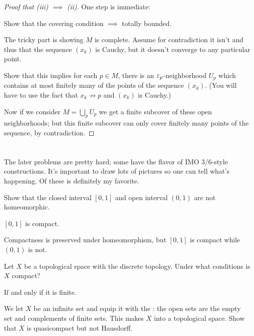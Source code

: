 \begin{proof}
	[Proof that (iii) $\implies$ (ii)]
	One step is immediate:
	\begin{ques}
		Show that the covering condition $\implies$ totally bounded.
	\end{ques}
	The tricky part is showing $M$ is complete.
	Assume for contradiction it isn't and thus that the sequence $(x_k)$ is Cauchy,
	but it doesn't converge to any particular point.
	\begin{ques}
		Show that this implies for each $p \in M$, there is an $\varepsilon_p$-neighborhood $U_p$
		which contains at most finitely many of the points of the sequence $(x_k)$.
		(You will have to use the fact that $x_k \not\to p$ and $(x_k)$ is Cauchy.)
	\end{ques}
	Now if we consider $M = \bigcup_p U_p$ we get a
	finite subcover of these open neighborhoods;
	but this finite subcover can only cover finitely
	many points of the sequence, by contradiction.
\end{proof}


\section{\problemhead}
The later problems are pretty hard;
some have the flavor of IMO 3/6-style constructions.
It's important to draw lots of pictures so one can tell what's happening.
Of these  is definitely my favorite.

\begin{problem}
	Show that the closed interval $[0,1]$ and
	open interval $(0,1)$ are not homeomorphic.
	\begin{hint}
		$[0,1]$ is compact.
	\end{hint}
	\begin{sol}
		Compactness is preserved under homeomorphism,
		but $[0,1]$ is compact while $(0,1)$ is not.
	\end{sol}
\end{problem}

\begin{problem}
	Let $X$ be a topological space with the discrete topology.
	Under what conditions is $X$ compact?
	\begin{hint}
		If and only if it is finite.
	\end{hint}
\end{problem}

\begin{problem}
	We let $X$ be an infinite set and equip it with the
	:
	the open sets are the empty set and complements of finite sets.
	This makes $X$ into a topological space.
	Show that $X$ is quasicompact but not Hausdorff.
\end{problem}

